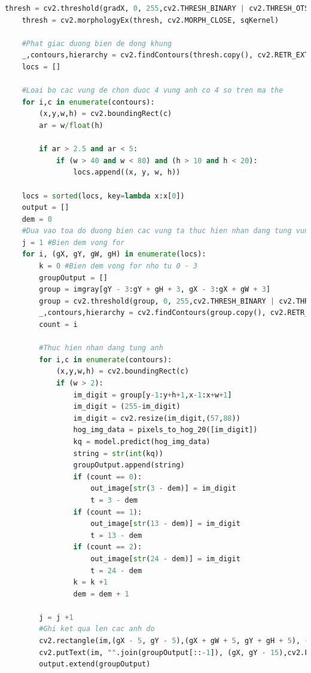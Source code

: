 \begin{lstlisting}[language=Python, caption=Recognition American Express]
    thresh = cv2.threshold(gradX, 0, 255,cv2.THRESH_BINARY | cv2.THRESH_OTSU)[1]
    thresh = cv2.morphologyEx(thresh, cv2.MORPH_CLOSE, sqKernel)

    #Phat giac duong bien de dong khung 
    _,contours,hierarchy = cv2.findContours(thresh.copy(), cv2.RETR_EXTERNAL, cv2.CHAIN_APPROX_SIMPLE)
    locs = []

    #Loai bo cac vung de chon duoc 4 vung anh co 4 so tren ma the
    for i,c in enumerate(contours):
        (x,y,w,h) = cv2.boundingRect(c)
        ar = w/float(h)

        if ar > 2.5 and ar < 5:
            if (w > 40 and w < 80) and (h > 10 and h < 20):
                locs.append((x, y, w, h))

    locs = sorted(locs, key=lambda x:x[0])
    output = [] 
    dem = 0
    #Dua vao toa do duong bien cac vung ta thuc hien nhan dang tung vung
    j = 1 #Bien dem vong for
    for i, (gX, gY, gW, gH) in enumerate(locs):
        k = 0 #Bien dem vong for nho tu 0 - 3
        groupOutput = [] 
        group = imgray[gY - 3:gY + gH + 3, gX - 3:gX + gW + 3]
        group = cv2.threshold(group, 0, 255,cv2.THRESH_BINARY | cv2.THRESH_OTSU)[1]
        _,contours,hierarchy = cv2.findContours(group.copy(), cv2.RETR_EXTERNAL,cv2.CHAIN_APPROX_SIMPLE)
        count = i

        #Thuc hien nhan dang tung anh
        for i,c in enumerate(contours):
            (x,y,w,h) = cv2.boundingRect(c)
            if (w > 2):     
                im_digit = group[y-1:y+h+1,x-1:x+w+1]
                im_digit = (255-im_digit)   
                im_digit = cv2.resize(im_digit,(57,88))
                hog_img_data = pixels_to_hog_20([im_digit])
                kq = model.predict(hog_img_data)
                string = str(int(kq))
                groupOutput.append(string)
                if (count == 0):
                    out_image[str(3 - dem)] = im_digit
                    t = 3 - dem
                if (count == 1):
                    out_image[str(13 - dem)] = im_digit
                    t = 13 - dem
                if (count == 2):
                    out_image[str(24 - dem)] = im_digit
                    t = 24 - dem
                k = k +1
                dem = dem + 1
            
        j = j +1
        #Ghi ket qua len cac anh do 
        cv2.rectangle(im,(gX - 5, gY - 5),(gX + gW + 5, gY + gH + 5), (255, 0, 255), 2)
        cv2.putText(im, "".join(groupOutput[::-1]), (gX, gY - 15),cv2.FONT_HERSHEY_SIMPLEX, 0.65, (0, 0, 255), 2)
        output.extend(groupOutput)


\end{lstlisting}

